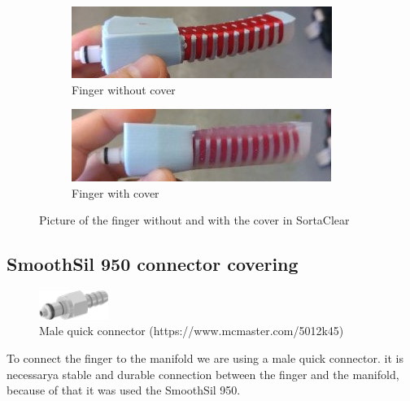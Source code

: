 \documentclass{article}
\begin{document}
\begin{figure}[h]
	\begin{subfigure}{0.5\textwidth}
		\includegraphics[width=1\linewidth, height=0.3\linewidth]{Pictures/fingerOnToroidal/WithoutCover.jpg} 
		\caption{Finger without cover}
		\label{fig:withoutCover}
	\end{subfigure}
	\hfill
	\begin{subfigure}{0.5\textwidth}
		\includegraphics[width=1\linewidth, height=0.3\linewidth]{Pictures/fingerOnToroidal/WithCover.jpg}
		\caption{Finger with cover}
		\label{fig:withCover}
	\end{subfigure}
 
	\caption{Picture of the finger without and with the cover in SortaClear}
	\label{fig:external}
\end{figure}


\subsection{SmoothSil 950 connector covering}
\begin{figure}
\centering
    \includegraphics[width=0.2\textwidth]{Pictures/fingerOnToroidal/Male_quick_connector.png}
    \caption{Male quick connector (https://www.mcmaster.com/5012k45)}
    \label{fig:MaleQuickConnector}
\end{figure}
To connect the finger to the manifold we are using a male quick connector. it is necessarya stable and durable connection between the finger and the manifold, because of that it was used the SmoothSil 950. 
\end{document}
